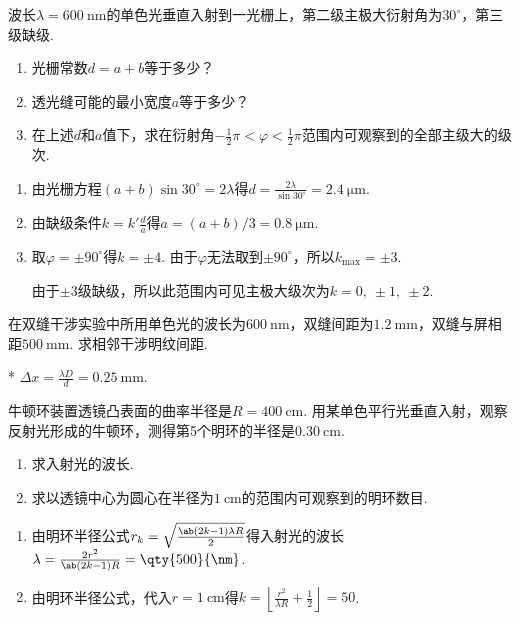 \begin{problem}[光栅][8]
    波长$\lambda=\qty{600}{\nm}$的单色光垂直入射到一光栅上，第二级主极大衍射角为$30^{\circ}$，第三级缺级.
    \begin{enumerate}
        \item 光栅常数$d=a+b$等于多少？
        \item 透光缝可能的最小宽度$a$等于多少？
        \item 在上述$d$和$a$值下，求在衍射角$-\frac{1}{2}\pi<\varphi<\frac{1}{2}\pi$范围内可观察到的全部主级大的级次.
    \end{enumerate}
\end{problem}
\begin{solution}
    \begin{enumerate}
        \item 由光栅方程$(a+b)\sin30^\circ=2\lambda$得$d=\frac{2\lambda}{\sin{30^{\circ}}}=\qty{2.4}{\um}$. 
        \item 由缺级条件$k=k'\frac{d}{a}$得$a=(a+b)/3=\qty{0.8}{\um}$. 
        \item 取$\varphi=\pm 90^\circ$得$k=\pm4$. 由于$\varphi$无法取到$\pm 90^\circ$，所以$k_{\max}=\pm 3$. 
        
        由于$\pm 3$级缺级，所以此范围内可见主极大级次为$k=0,\ \pm 1,\ \pm2$. 
    \end{enumerate}
\end{solution}

\begin{problem}[双缝干涉][5]
    在双缝干涉实验中所用单色光的波长为$\qty{600}{\nm}$，双缝间距为$\qty{1.2}{\mm}$，双缝与屏相距$\qty{500}{\mm}$. 求相邻干涉明纹间距.
\end{problem}
\begin{solution}*
    $\Delta x=\frac{\lambda D}{d}=\qty{0.25}{\mm}$. 
\end{solution}

\begin{problem}[牛顿环][8]
    牛顿环装置透镜凸表面的曲率半径是$R=\qty{400}{\cm}$. 用某单色平行光垂直入射，观察反射光形成的牛顿环，测得第5个明环的半径是$\qty{0.30}{\cm}$.
    \begin{enumerate}
        \item 求入射光的波长.
        \item 求以透镜中心为圆心在半径为$\qty{1}{\cm}$的范围内可观察到的明环数目.
    \end{enumerate}
\end{problem}
\begin{solution}
    \begin{enumerate}
    \item 由明环半径公式$r_k=\sqrt{\frac{\ab(2k-1)\lambda R}{2}}$得入射光的波长$\lambda=\frac{2r^2}{\ab(2k-1)R}=\qty{500}{\nm}$. 
    \item 由明环半径公式，代入$r=\qty{1}{\cm}$得$k=\left\lfloor\frac{r^2}{\lambda R}+\frac{1}{2}\right\rfloor=50$. 
    \end{enumerate}
\end{solution}

